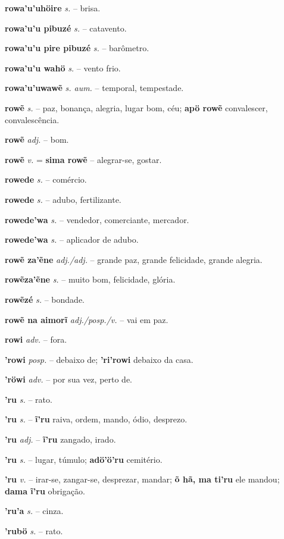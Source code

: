 \textbf{rowa'u'uhöire} \textit{s.} -- brisa.

\textbf{rowa'u'u pibuzé} \textit{s.} -- catavento.

\textbf{rowa'u'u pire pibuzé} \textit{s.} -- barômetro.

\textbf{rowa'u'u wahö} \textit{s.} -- vento frio.

\textbf{rowa'u'uwawẽ} \textit{s. aum.} -- temporal, tempestade.

\textbf{rowẽ} \textit{s.} -- paz, bonança, alegria, lugar bom, céu; \textbf{apö rowẽ} convalescer, convalescência.

\textbf{rowẽ} \textit{adj.} -- bom.

\textbf{rowẽ} \textit{v.} = \textbf{sima rowẽ} -- alegrar-se, gostar.

\textbf{rowede} \textit{s.} -- comércio.

\textbf{rowede} \textit{s.} -- adubo, fertilizante.

\textbf{rowede'wa} \textit{s.} -- vendedor, comerciante, mercador.

\textbf{rowede'wa} \textit{s.} -- aplicador de adubo.

\textbf{rowẽ za'ẽne} \textit{adj./adj.} -- grande paz, grande felicidade, grande alegria.

\textbf{rowẽza'ẽne} \textit{s.} -- muito bom, felicidade, glória.

\textbf{rowẽzé} \textit{s.} -- bondade.

\textbf{rowẽ na aimorĩ} \textit{adj./posp./v.} -- vai em paz.

\textbf{rowi} \textit{adv.} -- fora.

\textbf{'rowi} \textit{posp.} -- debaixo de; \textbf{'ri'rowi} debaixo da casa.

\textbf{'röwi} \textit{adv.} -- por sua vez, perto de.

\textbf{'ru} \textit{s.} -- rato.

\textbf{'ru} \textit{s.} -- \textbf{ĩ'ru} raiva, ordem, mando, ódio, desprezo.

\textbf{'ru} \textit{adj.} -- \textbf{ĩ'ru} zangado, irado.

\textbf{'ru} \textit{s.} -- lugar, túmulo; \textbf{adö'ö'ru} cemitério.

\textbf{'ru} \textit{v.} -- irar-se, zangar-se, desprezar, mandar; \textbf{õ hã, ma ti'ru} ele mandou; \textbf{dama ĩ'ru} obrigação.

\textbf{'ru'a} \textit{s.} -- cinza.

\textbf{'rubö} \textit{s.} -- rato.

